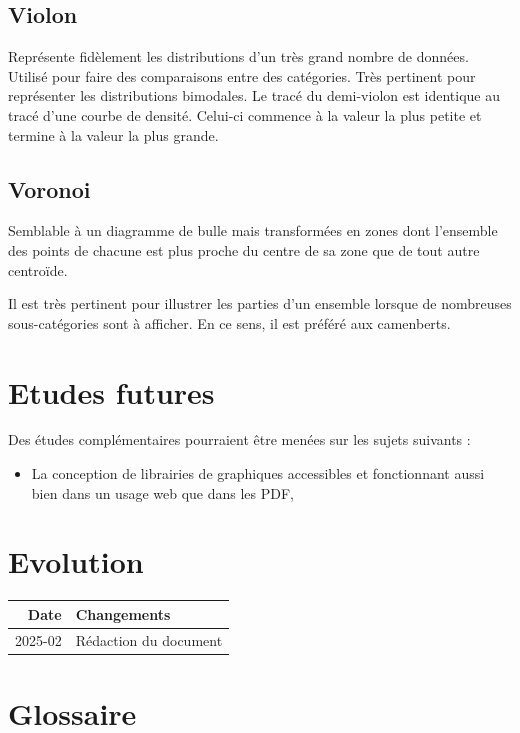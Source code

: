 \documentclass[a4paper,12pt]{article}
\begin{document}
\begin{multicols}{2}
\subsection*{Violon}
\label{sec:org61d234a}
Représente fidèlement les distributions d'un très grand nombre de données. \autocite{alansmithLexiqueVisuel} Utilisé pour faire des comparaisons entre des catégories. \autocite{mikeyiHowChooseRight2020}  Très pertinent pour représenter les distributions bimodales. \autocite{wilkeVisualizingManyDistributions2019} Le tracé du demi-violon est identique au tracé d'une courbe de densité. Celui-ci commence à la valeur la plus petite et termine à la valeur la plus grande.
\subsection*{Voronoi}
\label{sec:org3af6642}
Semblable à un diagramme de bulle mais transformées en zones dont l'ensemble des points de chacune est plus proche du centre de sa zone que de tout autre centroïde. \autocite{alansmithLexiqueVisuel}

Il est très pertinent pour illustrer les parties d'un ensemble lorsque de nombreuses sous-catégories sont à afficher. \autocite{jonathanschwabishParttowhole2021} En ce sens, il est préféré aux camenberts.
\section*{Etudes futures}
\label{sec:org4cb842b}
Des études complémentaires pourraient être menées sur les sujets suivants :
\begin{itemize}
\item La conception de librairies de graphiques accessibles et fonctionnant aussi bien dans un usage web que dans les PDF,
\end{itemize}
\section*{Evolution}
\label{sec:org81ef18f}
\begin{center}
\begin{tabular}{rl}
Date & Changements\\
\hline
2025-02 & Rédaction du document\\
\end{tabular}
\end{center}
\section*{Glossaire}
\label{sec:orgcced492}

\end{multicols}
\end{document}
